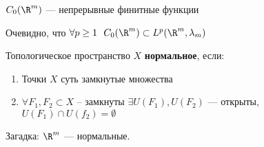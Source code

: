 \begin{obozn}
    \(C_0(\R^m)\) --- непрерывные финитные функции
\end{obozn}

Очевидно, что \(\forall p \geq 1 \ \ C_0(\R^m) \subset L^p(\R^m, \lambda_m)\)

\begin{definition}
    Топологическое пространство \(X\) \textbf{нормальное}, если:
    \begin{enumerate}
        \item Точки \(X\) суть замкнутые множества
        \item \(\forall F_1, F_2 \subset X\) -- замкнуты \(\exists U(F_1), U(F_2)\) --- открыты, \(U(F_1) \cap U(f_2) = \emptyset\)
    \end{enumerate}
\end{definition}

Загадка: \(\R^m\) --- нормальные.

